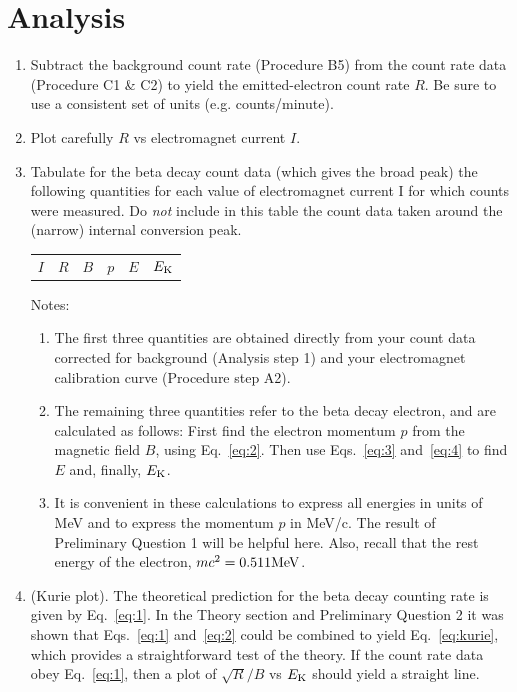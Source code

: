 \section{Analysis}

\begin{enumerate}

\item Subtract the background count rate (Procedure B5) from the count
rate data (Procedure C1 \& C2) to yield the emitted-electron count rate
$R$.  Be sure to use a consistent set of units (e.g. counts/minute).

\item Plot carefully $R$ vs electromagnet current $I$.

\item Tabulate for the beta decay count data (which gives the
broad peak) the following quantities for each value of electromagnet
current I for which counts were measured.  Do {\em not}
include in this table the count data taken around the (narrow) internal
conversion peak.

\begin{tabular}{c c c c c c}
$I$ & $R$ & $B$ & $p$ & $E$ & $E_{\rm K}$\\
\end{tabular}

Notes:
\begin{enumerate}
\item The first three quantities are obtained directly from your count
data corrected for background (Analysis step 1) and your electromagnet
calibration curve (Procedure step A2).

\item The remaining three quantities refer to the beta decay electron,
and are calculated as follows:  First find the electron momentum $p$ from the magnetic field $B$,
using Eq.~\ref{eq:2}.  Then use Eqs.~\ref{eq:3} and~\ref{eq:4} to find $E$ and, finally,
$E_{\rm K}$.

\item It is convenient in these calculations to express all
energies in units of MeV and to express the momentum $p$ in MeV/c.  The
result of Preliminary Question 1 will be helpful here.  Also, recall
that the rest energy of the electron, $mc^2 = 0.511 {\rm MeV}$.
\end{enumerate}

\item (Kurie plot).  The theoretical prediction for the beta
decay counting rate is given by Eq.~\ref{eq:1}.  In the Theory section and
Preliminary Question 2 it was shown that Eqs.~\ref{eq:1} and~\ref{eq:2} could be
combined  to yield Eq.~\ref{eq:kurie}, which provides a straightforward test of
the theory.  If the count rate data obey Eq.~\ref{eq:1}, then a plot of
$\sqrt{R}/B$ vs $E_{\rm K}$ should yield a straight line.


\end{enumerate}
